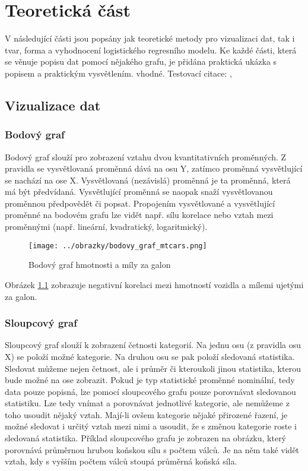 \chapter{Teoretická část}
V následující části jsou popsány jak teoretické metody pro vizualizaci dat, tak i tvar, forma a vyhodnocení logistického regresního modelu. 
Ke každé části, která se věnuje popisu dat pomocí nějakého grafu, je přidána praktická ukázka s popisem a praktickým vysvětlením.
vhodné.
Testovací citace: \cite{Hebak2015}, \cite{Kleinbaum2010}

\section{Vizualizace dat} \label{sec:vizualizace_dat}
\subsection{Bodový graf}
Bodový graf slouží pro zobrazení vztahu dvou kvantitativních proměnných. Z pravidla se vysvětlovaná proměnná dává na osu Y,
zatímco proměnná vysvětlující se nachází na ose X. Vysvětlovaná (nezávislá) proměnná je ta proměnná, která má být předvídaná.
Vysvětlující proměnná se naopak snaží vysvětlovanou proměnnou předpovědět či popsat. Propojením vysvětlované a vysvětlující proměnné
na bodovém grafu lze vidět např. sílu korelace nebo vztah mezi proměnnými (např. lineární, kvadratický, logaritmický).

\begin{figure}[H]
    \centering
    \texttt{[image: ../obrazky/bodovy\_graf\_mtcars.png]}
    \caption{Bodový graf hmotnosti a míly za galon} 
    \label{fig:bodovy_graf_mtcars}
\end{figure}

Obrázek \ref{fig:bodovy_graf_mtcars} zobrazuje negativní korelaci mezi hmotností vozidla a mílemi ujetými za galon.

\subsection{Sloupcový graf}
Sloupcový graf slouží k zobrazení četnosti kategorií. Na jednu osu (z pravidla osu X) se položí možné kategorie. Na druhou osu
se pak položí sledovaná statistika.
{\color{red}
Sledovat můžeme nejen četnost, ale i průměr či kteroukoli jinou statistika, kterou bude možné na ose zobrazit.
Pokud je typ statistické proměnné nominální, tedy data pouze popisná, lze pomocí sloupcového grafu pouze porovnávat sledovanou statistiku. Lze tedy
vnímat a porovnávat jednotlivé kategorie, ale nemůžeme z toho usoudit nějaký vztah.
Mají-li ovšem kategorie nějaké přirozené řazení, je možné sledovat i určitý vztah mezi nimi a usoudit, že s změnou kategorie roste i sledovaná statistika.
Příklad sloupcového grafu je zobrazen na obrázku, který porovnává průměrnou hrubou koňskou sílu s počtem válců.
Je na něm také vidět vztah, kdy s vyšším počtem válců stoupá průměrná koňská síla.
}

